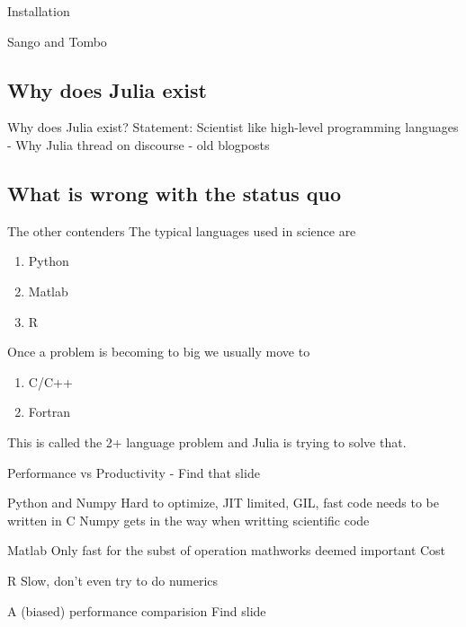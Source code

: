 \documentclass{beamer}
\begin{document}
\begin{frame}{Installation}
\begin{block}{Sango and Tombo}
\subsection{Why does Julia exist}
\begin{frame}{Why does Julia exist?}
  Statement: Scientist like high-level programming languages
  - Why Julia thread on discourse
  - old blogposts
\end{frame}
\subsection{What is wrong with the status quo}
\begin{frame}{The other contenders}
  The typical languages used in science are
  \begin{enumerate}
    \item Python
    \item Matlab
    \item R
  \end{enumerate}

  Once a problem is becoming to big we usually move to
  \begin{enumerate}
    \item C/C++
    \item Fortran
  \end{enumerate}
  This is called the 2+ language problem and Julia is trying to solve that.
\end{frame}

\begin{frame}{Performance vs Productivity}
  - Find that slide
\end{frame}

\begin{frame}{Python and Numpy}
  Hard to optimize, JIT limited, GIL, fast code needs to be written in C
  Numpy gets in the way when writting scientific code
\end{frame}

\begin{frame}{Matlab}
  Only fast for the subst of operation mathworks deemed important
  Cost
\end{frame}

\begin{frame}{R}
  Slow, don't even try to do numerics
\end{frame}

\begin{frame}{A (biased) performance comparision}
  Find slide
\end{frame}


\end{block}
\end{frame}
\end{document}
